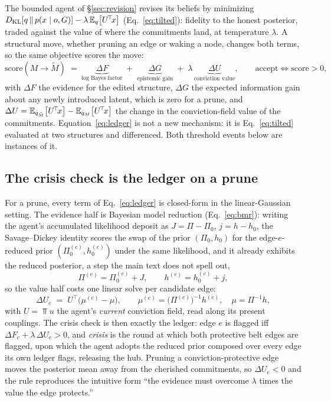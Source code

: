 The bounded agent of \S\ref{sec:revision} revises its beliefs by minimizing
$D_{\mathrm{KL}}\!\left[q\,\middle\|\,p(x\mid o,G)\right]-\lambda\,\mathbb{E}_{q}\!\left[U^{\!\top}\!x\right]$ (Eq.~\ref{eq:tilted}): fidelity to the
honest posterior, traded against the value of where the commitments land, at temperature
$\lambda$. A structural move, whether pruning an edge or waking a node, changes both terms, so
the same objective scores the move:
\begin{equation}
\mathrm{score}(M\!\to\!\tilde M)
\;=\;
\underbrace{\Delta F}_{\text{log Bayes factor}}
\;+\;
\underbrace{\Delta G}_{\text{epistemic gain}}
\;+\;
\lambda\,\underbrace{\Delta U}_{\text{conviction value}},
\qquad
\text{accept}\iff \mathrm{score}>0,
\label{eq:ledger}
\end{equation}
with $\Delta F$ the evidence for the edited structure, $\Delta G$ the expected information gain
about any newly introduced latent, which is zero for a prune, and
$\Delta U = \mathbb{E}_{q_{\tilde M}}\!\left[U^{\!\top}\!x\right]-\mathbb{E}_{q_{M}}\!\left[U^{\!\top}\!x\right]$ the change in the
conviction-field value of the commitments. Equation~\eqref{eq:ledger} is not a new mechanism:
it is Eq.~\eqref{eq:tilted} evaluated at two structures and differenced. Both threshold events
below are instances of it.

\subsection{The crisis check is the ledger on a prune}

For a prune, every term of Eq.~\eqref{eq:ledger} is closed-form in the linear-Gaussian setting.
The evidence half is Bayesian model reduction (Eq.~\ref{eq:bmr}): writing the agent's
accumulated likelihood deposit as $J=\Pi-\Pi_0$, $j=h-h_0$, the Savage--Dickey identity scores
the swap of the prior $(\Pi_0,h_0)$ for the edge-$e$-reduced prior $(\Pi_0^{(e)},h_0^{(e)})$
under the same likelihood, and it already exhibits the reduced posterior, a step the main text
does not spell out,
\begin{equation}
\Pi^{(e)} = \Pi_0^{(e)} + J,
\qquad
h^{(e)} = h_0^{(e)} + j ,
\end{equation}
so the value half costs one linear solve per candidate edge:
\begin{equation}
\Delta U_e \;=\; U^{\!\top}\!\bigl(\mu^{(e)}-\mu\bigr),
\qquad
\mu^{(e)} = \bigl(\Pi^{(e)}\bigr)^{-1}h^{(e)},\quad \mu = \Pi^{-1}h,
\label{eq:dU-prune}
\end{equation}
with $U=\Top u$ the agent's \emph{current} conviction field, read along its present couplings.
The crisis check is then exactly the ledger: edge $e$ is flagged iff
$\Delta F_e + \lambda\,\Delta U_e > 0$, and \emph{crisis} is the round at which both protective
belt edges are flagged, upon which the agent adopts the reduced prior composed over every edge
its own ledger flags, releasing the hub. Pruning a conviction-protective edge moves the
posterior mean away from the cherished commitments, so $\Delta U_e<0$ and the rule reproduces
the intuitive form ``the evidence must overcome $\lambda$ times the value the edge protects.''

